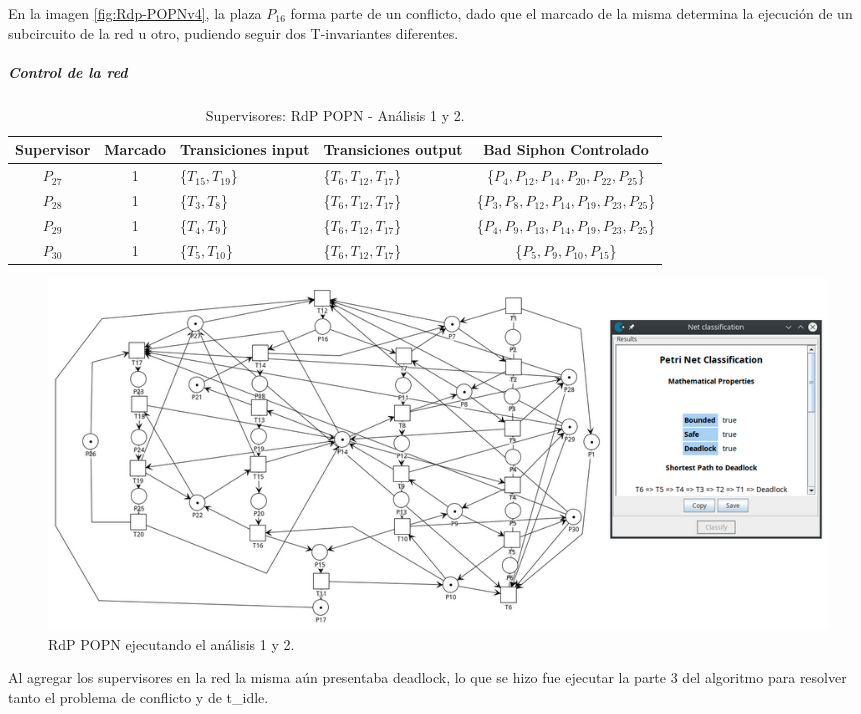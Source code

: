 En la imagen \ref{fig:Rdp-POPNv4}, la plaza $P_{16}$ forma parte de un conflicto, dado que el marcado de la misma determina la ejecución de un subcircuito de la red u otro, pudiendo seguir dos T-invariantes diferentes. 
\bigskip

\subparagraph{Control de la red}
\hfill \break

\begin{table}[H]
    \small
    \centering
    \begin{tabular}{|c|c|P{2cm}|P{2.3cm}|c|}
    \hline
    \textbf{Supervisor} & \textbf{Marcado} & \textbf{Transiciones input} & \textbf{Transiciones output} & \textbf{Bad Siphon Controlado}  \\  \hline
    $P_{27}$ & 1 & \{$T_{15}, T_{19}$\} & \{$T_{6}, T_{12}, T_{17}$\} & \{$P_4, P_{12}, P_{14}, P_{20}, P_{22}, P_{25}$\} \\ 
    \hline
    $P_{28}$ & 1 & \{$T_{3}, T_{8}$\} & \{$T_{6}, T_{12}, T_{17}$\} & \{$P_{3},P_{8},P_{12},P_{14}, P_{19}, P_{23}, P_{25}$\} \\ 
    \hline
    $P_{29}$ & 1 & \{$T_{4}, T_{9}$\} & \{$T_{6}, T_{12}, T_{17}$\} & \{$P_{4},P_{9},P_{13},P_{14}, P_{19}, P_{23}, P_{25}$\} \\ 
    \hline
    $P_{30}$ & 1 & \{$T_{5}, T_{10}$\} & \{$T_{6}, T_{12}, T_{17}$\} & \{$P_{5},P_{9},P_{10},P_{15}$\} \\ 
    \hline
    \end{tabular}
    \caption{Supervisores: RdP POPN - Análisis 1 y 2.}
    \label{tab:POPN12-v4}
\end{table}
\hfill
\bigskip

\begin{figure}[H]
	\centering
	\includegraphics[width=\textwidth]{Figures/algoritmo4/popn_imag2.png}
	\caption{RdP POPN ejecutando el análisis 1 y 2.}
	\label{fig:Rdp-POPN-1y2v4}
\end{figure}
\bigskip

Al agregar los supervisores en la red la misma aún presentaba deadlock, lo que se hizo fue ejecutar la parte 3 del algoritmo para resolver tanto el problema de conflicto y de t\_idle.


